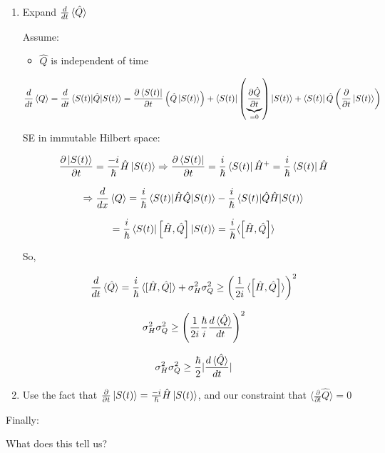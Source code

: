 \documentclass{article}
\begin{document}
\begin{enumerate}
    \item Expand $\frac{d}{dt} \braket{\hat{Q}}$
    
    Assume:
    
    \begin{itemize}
        \item $\hat{Q}$ is independent of time
    \end{itemize}
    
    $$\frac{d}{dt} \braket{Q} = \frac{d}{dt} \braket{S(t)|\hat{Q}|S(t)} = \frac{\partial \bra{S(t)}}{\partial t} \left( \hat{Q} \ket{S(t)} \right) + \braket{S(t)| \left( \underbrace{\frac{\partial \hat{Q}}{\partial t}}_{=0} \right)|S(t)} + \bra{S(t)} \hat{Q} \left( \frac{\partial}{\partial t} \ket{S(t)} \right)$$
    
    SE in immutable Hilbert space:
    
    $$\frac{\partial \ket{S(t)}}{\partial t} = \frac{-i}{\hbar} \hat{H} \ket{S(t)} \Rightarrow \frac{\partial \bra{S(t)}}{\partial t} = \frac{i}{\hbar} \bra{S(t)} \hat{H}^+ = \frac{i}{\hbar} \bra{S(t)} \hat{H}$$
    
    $$\Rightarrow \frac{d}{dx} \braket{Q} = \frac{i}{\hbar} \braket{S(t)|\hat{H} \hat{Q} | S(t)} - \frac{i}{\hbar} \braket{S(t)|\hat{Q} \hat{H}|S(t)}$$
    
    $$= \frac{i}{\hbar} \braket{S(t)| \left[ \hat{H}, \hat{Q} \right] |S(t)} = \frac{i}{\hbar } \langle \left[ \hat{H}, \hat{Q} \right] \rangle$$
    
    So, 
    
    $$\frac{d}{dt} \braket{\hat{Q}} = \frac{i}{\hbar} \braket{[\hat{H}, \hat{Q}]} + \sigma_H^2 \sigma_Q^2 \geq \left( \frac{1}{2i} \braket{\left[ \hat{H}, \hat{Q} \right]} \right)^2$$
    
    $$\sigma_H^2 \sigma_Q^2 \geq \left( \frac{1}{2i} \frac{\hbar}{i} \frac{d \braket{\hat{Q}}}{dt} \right)^2$$
    
    $$\sigma_H^2 \sigma_Q^2 \geq \frac{\hbar}{2} |  \frac{d \braket{\hat{Q}}}{dt}|$$
    
    
    \item Use the fact that $\frac{\partial}{\partial t} \ket{S(t)} = \frac{-i}{\hbar} \hat{H} \ket{S(t)}$, and our constraint that $\langle \frac{\partial}{\partial t} \hat{Q} \rangle = 0$
\end{enumerate}

Finally:


What does this tell us?
\end{document}
